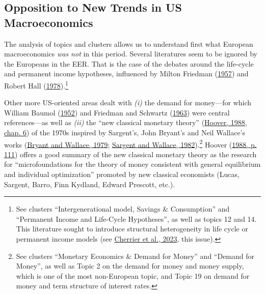 \documentclass[
  12pt,
  onecolumn]{article}
\begin{document}
\hypertarget{opposition-trends}{%
\subsection{Opposition to New Trends in US Macroeconomics}\label{opposition-trends}}

The analysis of topics and clusters allows us to understand first what European macroeconomics \emph{was not} in this period. Several literatures seem to be ignored by the Europeans in the EER. That is the case of the debates around the life-cycle and permanent income hypotheses, influenced by Milton Friedman (\protect\hyperlink{ref-friedman1957}{1957}) and Robert Hall (\protect\hyperlink{ref-hall1978b}{1978}).\footnote{See clusters ``Intergenerational model, Savings \& Consumption'' and ``Permanent Income and Life-Cycle Hypotheses'', as well as topics 12 and 14. This literature sought to introduce structural heterogeneity in life cycle or permanent income models (see \protect\hyperlink{ref-cherrier2023}{Cherrier et al., 2023}, this issue).}

Other more US-oriented areas dealt with \emph{(i)} the demand for money---for which William Baumol (\protect\hyperlink{ref-baumol1952}{1952}) and Friedman and Schwartz (\protect\hyperlink{ref-friedman1963}{1963}) were central references---as well as \emph{(ii)} the ``new classical monetary theory'' (\protect\hyperlink{ref-hoover1988}{Hoover, 1988, chap. 6}) of the 1970s inspired by Sargent's, John Bryant's and Neil Wallace's works (\protect\hyperlink{ref-bryant1979}{Bryant and Wallace, 1979}; \protect\hyperlink{ref-sargent1982}{Sargent and Wallace, 1982}).\footnote{See clusters ``Monetary Economics \& Demand for Money'' and ``Demand for Money'', as well as Topic 2 on the demand for money and money supply, which is one of the most non-European topic, and Topic 19 on demand for money and term structure of interest rates.} Hoover (\protect\hyperlink{ref-hoover1988}{1988, p. 111}) offers a good summary of the new classical monetary theory as the research for ``microfoundations for the theory of money consistent with general equilibrium and individual optimization'' promoted by new classical economists (Lucas, Sargent, Barro, Finn Kydland, Edward Prescott, etc.).
\end{document}
